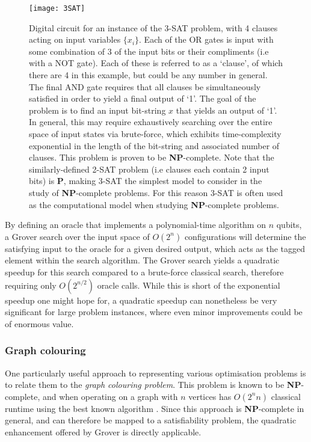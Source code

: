 \begin{figure}[htpb]
\texttt{[image: 3SAT]}
\caption{Digital circuit for an instance of the 3-\textsc{SAT} problem, with 4 clauses acting on input variables $\{x_i\}$. Each of the OR gates is input with some combination of 3 of the input bits or their compliments (i.e with a NOT gate). Each of these is referred to as a `clause', of which there are 4 in this example, but could be any number in general. The final AND gate requires that all clauses be simultaneously satisfied in order to yield a final output of `1'. The goal of the problem is to find an input bit-string $x$ that yields an output of `1'. In general, this may require exhaustively searching over the entire space of input states via brute-force, which exhibits time-complexity exponential in the length of the bit-string and associated number of clauses. This problem is proven to be \textbf{NP}-complete. Note that the similarly-defined 2-\textsc{SAT} problem (i.e clauses each contain 2 input bits) is \textbf{P}, making 3-\textsc{SAT} the simplest model to consider in the study of \textbf{NP}-complete problems. For this reason 3-\textsc{SAT} is often used as the computational model when studying \textbf{NP}-complete problems.} \label{fig:3SAT}	
\end{figure}

By defining an oracle that implements a polynomial-time algorithm on $n$ qubits, a Grover search over the input space of $O(2^n)$ configurations will determine the satisfying input to the oracle for a given desired output, which acts as the tagged element within the search algorithm. The Grover search yields a quadratic speedup for this search compared to a brute-force classical search, therefore requiring only $O(2^{n/2})$ oracle calls. While this is short of the exponential speedup one might hope for, a quadratic speedup can nonetheless be very significant for large problem instances, where even minor improvements could be of enormous value.

\subsubsection{Graph colouring}

One particularly useful approach to representing various optimisation problems is to relate them to the \textit{graph colouring problem}. This problem is known to be \textbf{NP}-complete, and when operating on a graph with $n$ vertices has $O(2^nn)$ classical runtime using the best known algorithm \cite{???}. Since this approach is \textbf{NP}-complete in general, and can therefore be mapped to a satisfiability problem, the quadratic enhancement offered by Grover is directly applicable.

